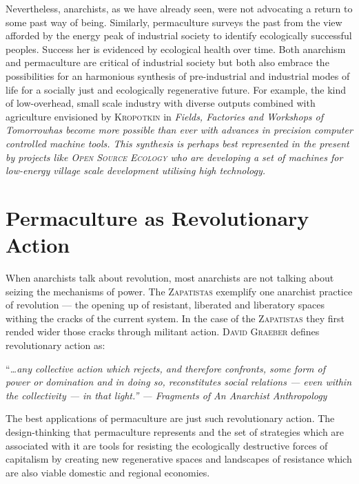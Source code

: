 \documentclass[a4paper, 11pt]{article}
\begin{document}
\begin{multicols*}{2}
Nevertheless, anarchists, as we have already seen, were not advocating a return to some past way of being.  Similarly, permaculture surveys the past from the view afforded by the energy peak of industrial society to identify ecologically successful peoples.  Success her is evidenced by ecological health over time.  Both anarchism and permaculture are critical of industrial society but both also embrace the possibilities for an harmonious synthesis of pre-industrial and industrial modes of life for a socially just and ecologically regenerative future.  For example, the kind of low-overhead, small scale industry with diverse outputs combined with agriculture envisioned by \textsc{Kropotkin} in \em{Fields, Factories and Workshops of Tomorrow}\em has become more possible than ever with advances in precision computer controlled machine tools.  This synthesis is perhaps best represented in the present by projects like \textsc{Open Source Ecology} who are developing a set of machines for low-energy village scale development utilising high technology.

\section*{Permaculture as Revolutionary Action}

When anarchists talk about revolution, most anarchists are not talking about seizing the mechanisms of power.  The \textsc{Zapatistas} exemplify one anarchist practice of revolution --- the opening up of resistant, liberated and liberatory spaces withing the cracks of the current system.  In the case of the \textsc{Zapatistas} they first rended wider those cracks through militant action.  \textsc{David Graeber} defines revolutionary action as:

\vspace{1mm}
``\em{\ldots any collective action which rejects, and therefore confronts, some form of power or domination and in doing so, reconstitutes social relations --- even within the collectivity --- in that light.}\em'' --- \em{Fragments of An Anarchist Anthropology}\em
\vspace{1mm}

The best applications of permaculture are just such revolutionary action.  The design-thinking that permaculture represents and the set of strategies which are associated with it are tools for resisting the ecologically destructive forces of capitalism by creating new regenerative spaces and landscapes of resistance which are also viable domestic and regional economies.


\end{multicols*}
\end{document}
